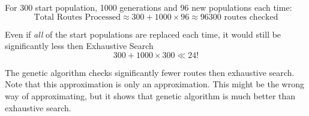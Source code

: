 \documentclass{article}
\begin{document}
    For 300 start population, 1000 generations and 96 new populations each time: 
    \[
    \text{Total Routes Processed} \approx 300 + 1000 \times 96 \approx 96300 \text{ routes checked}
    \]

    Even if \textit{all} of the start populations are replaced each time, it would still be significantly less then Exhaustive Search
    \[
    300 + 1000 \times 300 \ll 24!
    \]


    The genetic algorithm checks significantly fewer routes then exhaustive search. Note that this approximation is only an approximation. This might be the wrong way of approximating, but it shows that genetic algorithm is much better than exhaustive search. 
\end{document}

